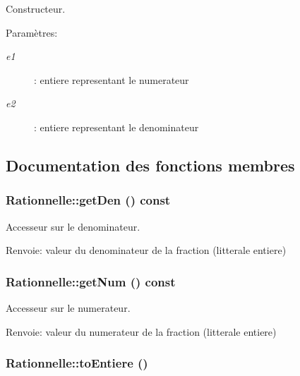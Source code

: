 Constructeur. 

\begin{Desc}
\item[Paramètres:]
\begin{description}
\item[{\em e1}]: entiere representant le numerateur \item[{\em e2}]: entiere representant le denominateur \end{description}
\end{Desc}


\subsection{Documentation des fonctions membres}
\hypertarget{class_rationnelle_fa5d908b5e2e972af5a431efb6686b52}{
\subsubsection[{getDen}]{ Rationnelle::getDen () const}}
\label{class_rationnelle_fa5d908b5e2e972af5a431efb6686b52}


Accesseur sur le denominateur. 

\begin{Desc}
\item[Renvoie:]valeur du denominateur de la fraction (litterale entiere) \end{Desc}
\hypertarget{class_rationnelle_7bb78e18fcebedf67e29da7b8da56483}{
\subsubsection[{getNum}]{ Rationnelle::getNum () const}}
\label{class_rationnelle_7bb78e18fcebedf67e29da7b8da56483}


Accesseur sur le numerateur. 

\begin{Desc}
\item[Renvoie:]valeur du numerateur de la fraction (litterale entiere) \end{Desc}
\hypertarget{class_rationnelle_a912b36ff009510986a131cf0d9d5c7b}{
\subsubsection[{toEntiere}]{ Rationnelle::toEntiere ()}}
\label{class_rationnelle_a912b36ff009510986a131cf0d9d5c7b}


